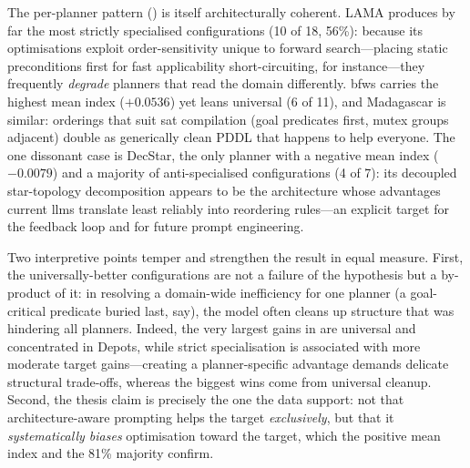 The per-planner pattern () is itself architecturally coherent. LAMA produces by far the most strictly specialised configurations (10 of 18, 56\%): because its optimisations exploit order-sensitivity unique to forward search---placing static preconditions first for fast applicability short-circuiting, for instance---they frequently \emph{degrade} planners that read the domain differently. \gls{bfws} carries the highest mean index ($+0.0536$) yet leans universal (6 of 11), and Madagascar is similar: orderings that suit \gls{sat} compilation (goal predicates first, mutex groups adjacent) double as generically clean PDDL that happens to help everyone. The one dissonant case is DecStar, the only planner with a negative mean index ($-0.0079$) and a majority of anti-specialised configurations (4 of 7): its decoupled star-topology decomposition appears to be the architecture whose advantages current \glspl{llm} translate least reliably into reordering rules---an explicit target for the feedback loop and for future prompt engineering.

Two interpretive points temper and strengthen the result in equal measure. First, the universally-better configurations are not a failure of the hypothesis but a by-product of it: in resolving a domain-wide inefficiency for one planner (a goal-critical predicate buried last, say), the model often cleans up structure that was hindering all planners. Indeed, the very largest gains in  are universal and concentrated in Depots, while strict specialisation is associated with more moderate target gains---creating a planner-specific advantage demands delicate structural trade-offs, whereas the biggest wins come from universal cleanup. Second, the thesis claim is precisely the one the data support: not that architecture-aware prompting helps the target \emph{exclusively}, but that it \emph{systematically biases} optimisation toward the target, which the positive mean index and the 81\% majority confirm.

